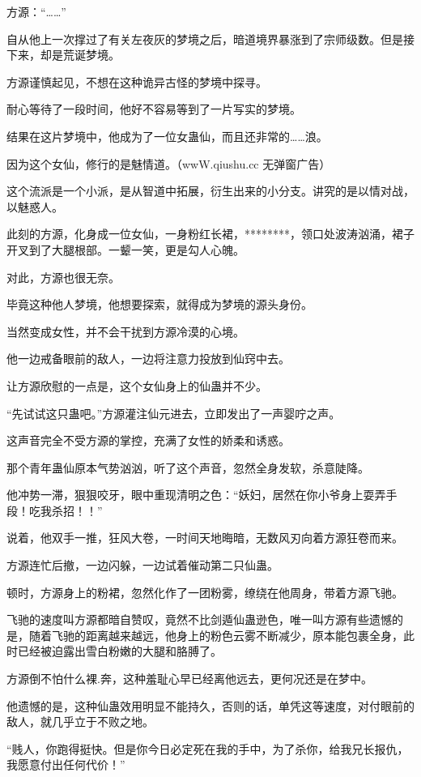 \begin{this_body}
方源：“……”

自从他上一次撑过了有关左夜灰的梦境之后，暗道境界暴涨到了宗师级数。但是接下来，却是荒诞梦境。

方源谨慎起见，不想在这种诡异古怪的梦境中探寻。

耐心等待了一段时间，他好不容易等到了一片写实的梦境。

结果在这片梦境中，他成为了一位女蛊仙，而且还非常的……浪。

因为这个女仙，修行的是魅情道。（wwW.qiushu.cc 无弹窗广告）

这个流派是一个小派，是从智道中拓展，衍生出来的小分支。讲究的是以情对战，以魅惑人。

此刻的方源，化身成一位女仙，一身粉红长裙，********，领口处波涛汹涌，裙子开叉到了大腿根部。一颦一笑，更是勾人心魄。

对此，方源也很无奈。

毕竟这种他人梦境，他想要探索，就得成为梦境的源头身份。

当然变成女性，并不会干扰到方源冷漠的心境。

他一边戒备眼前的敌人，一边将注意力投放到仙窍中去。

让方源欣慰的一点是，这个女仙身上的仙蛊并不少。

“先试试这只蛊吧。”方源灌注仙元进去，立即发出了一声婴咛之声。

这声音完全不受方源的掌控，充满了女性的娇柔和诱惑。

那个青年蛊仙原本气势汹汹，听了这个声音，忽然全身发软，杀意陡降。

他冲势一滞，狠狠咬牙，眼中重现清明之色：“妖妇，居然在你小爷身上耍弄手段！吃我杀招！！”

说着，他双手一推，狂风大卷，一时间天地晦暗，无数风刃向着方源狂卷而来。

方源连忙后撤，一边闪躲，一边试着催动第二只仙蛊。

顿时，方源身上的粉裙，忽然化作了一团粉雾，缭绕在他周身，带着方源飞驰。

飞驰的速度叫方源都暗自赞叹，竟然不比剑遁仙蛊逊色，唯一叫方源有些遗憾的是，随着飞驰的距离越来越远，他身上的粉色云雾不断减少，原本能包裹全身，此时已经被迫露出雪白粉嫩的大腿和胳膊了。

方源倒不怕什么裸.奔，这种羞耻心早已经离他远去，更何况还是在梦中。

他遗憾的是，这种仙蛊效用明显不能持久，否则的话，单凭这等速度，对付眼前的敌人，就几乎立于不败之地。

“贱人，你跑得挺快。但是你今日必定死在我的手中，为了杀你，给我兄长报仇，我愿意付出任何代价！”


\end{this_body}
